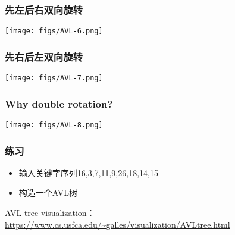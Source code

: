 \begin{frame}[fragile]
  \frametitle{先左后右双向旋转}
  \texttt{[image: figs/AVL-6.png]}
\end{frame}


\begin{frame}[fragile]
  \frametitle{先右后左双向旋转}
  \texttt{[image: figs/AVL-7.png]}
\end{frame}


\begin{frame}[fragile]
  \frametitle{Why double rotation?}
  \texttt{[image: figs/AVL-8.png]}
\end{frame}

\begin{frame}[fragile]
  \frametitle{练习}
  \begin{itemize}
  \item 输入关键字序列16,3,7,11,9,26,18,14,15
  \item 构造一个AVL树
  \end{itemize}

  AVL tree visualization：
  \url{https://www.cs.usfca.edu/\~galles/visualization/AVLtree.html}
\end{frame}

